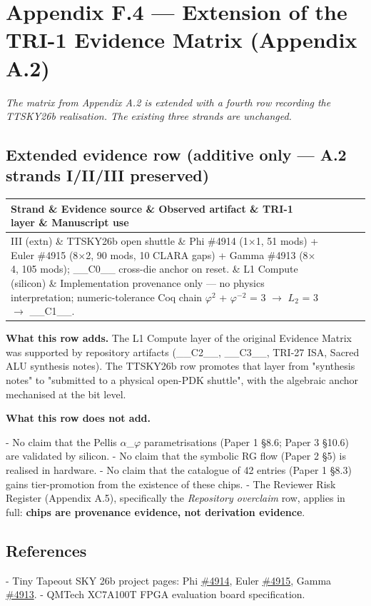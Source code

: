 
\section{Appendix F.4 --- Extension of the TRI-1 Evidence Matrix (Appendix A.2)}

\textit{The matrix from Appendix A.2 is extended with a fourth row recording the TTSKY26b realisation. The existing three strands are unchanged.}

\subsection{Extended evidence row (additive only --- A.2 strands I/II/III preserved)}

\begin{tabular}{|l|l|l|l|l|}
\hline
Strand \& Evidence source \& Observed artifact \& TRI-1 layer \& Manuscript use \\
\hline
III (extn) \& TTSKY26b open shuttle \& Phi \#4914 (1$\times$1, 51 mods) + Euler \#4915 (8$\times$2, 90 mods, 10 CLARA gaps) + Gamma \#4913 (8$\times$4, 105 mods); \_\_C0\_\_ cross-die anchor on reset. \& L1 Compute (silicon) \& Implementation provenance only --- no physics interpretation; numeric-tolerance Coq chain $\varphi^{2}$ + $\varphi^{-2}$ = 3 $\rightarrow$ $L_{2}$ = 3 $\rightarrow$ \_\_C1\_\_. \\
\hline
\end{tabular}
\textbf{What this row adds.} The L1 Compute layer of the original Evidence Matrix was supported by repository artifacts (\_\_C2\_\_, \_\_C3\_\_, TRI-27 ISA, Sacred ALU synthesis notes). The TTSKY26b row promotes that layer from "synthesis notes" to "submitted to a physical open-PDK shuttle", with the algebraic anchor mechanised at the bit level.

\textbf{What this row does not add.}

- No claim that the Pellis $\alpha$\_$\varphi$ parametrisations (Paper 1 §8.6; Paper 3 §10.6) are validated by silicon.
- No claim that the symbolic RG flow (Paper 2 §5) is realised in hardware.
- No claim that the catalogue of 42 entries (Paper 1 §8.3) gains tier-promotion from the existence of these chips.
- The Reviewer Risk Register (Appendix A.5), specifically the \textit{Repository overclaim} row, applies in full: \textbf{chips are provenance evidence, not derivation evidence}.

\subsection{References}

- Tiny Tapeout SKY 26b project pages: Phi \href{https://app.tinytapeout.com/projects/4914}{\#4914}, Euler \href{https://app.tinytapeout.com/projects/4915}{\#4915}, Gamma \href{https://app.tinytapeout.com/projects/4913}{\#4913}.
- QMTech XC7A100T FPGA evaluation board specification.
